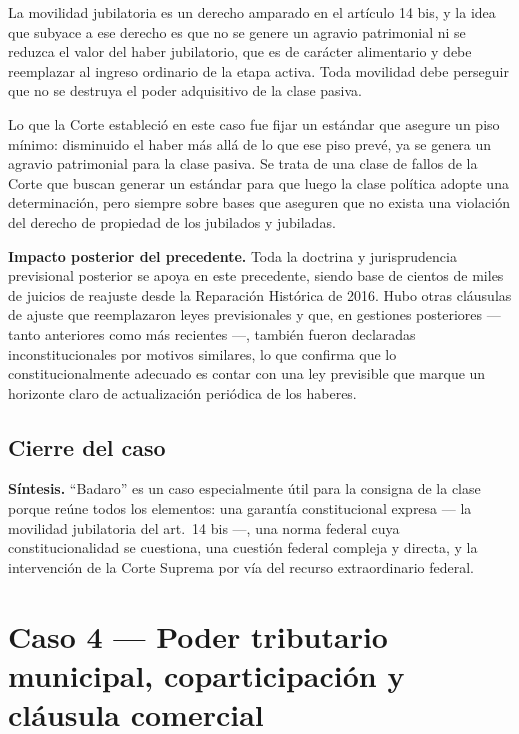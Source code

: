 \documentclass[12pt,oneside]{book}
\begin{document}
La movilidad jubilatoria es un derecho amparado en el artículo 14 bis, y la idea que subyace a ese derecho es que no se genere un agravio patrimonial ni se reduzca el valor del haber jubilatorio, que es de carácter alimentario y debe reemplazar al ingreso ordinario de la etapa activa. Toda movilidad debe perseguir que no se destruya el poder adquisitivo de la clase pasiva.

Lo que la Corte estableció en este caso fue fijar un estándar que asegure un piso mínimo: disminuido el haber más allá de lo que ese piso prevé, ya se genera un agravio patrimonial para la clase pasiva. Se trata de una clase de fallos de la Corte que buscan generar un estándar para que luego la clase política adopte una determinación, pero siempre sobre bases que aseguren que no exista una violación del derecho de propiedad de los jubilados y jubiladas.

\begin{note}
\textbf{Impacto posterior del precedente.} Toda la doctrina y jurisprudencia previsional posterior se apoya en este precedente, siendo base de cientos de miles de juicios de reajuste desde la Reparación Histórica de 2016. Hubo otras cláusulas de ajuste que reemplazaron leyes previsionales y que, en gestiones posteriores --- tanto anteriores como más recientes ---, también fueron declaradas inconstitucionales por motivos similares, lo que confirma que lo constitucionalmente adecuado es contar con una ley previsible que marque un horizonte claro de actualización periódica de los haberes.
\end{note}

\section{Cierre del caso}

\begin{important}
\textbf{Síntesis.} ``Badaro'' es un caso especialmente útil para la consigna de la clase porque reúne todos los elementos: una garantía constitucional expresa --- la movilidad jubilatoria del art.\ 14 bis ---, una norma federal cuya constitucionalidad se cuestiona, una cuestión federal compleja y directa, y la intervención de la Corte Suprema por vía del recurso extraordinario federal.
\end{important}

\chapter[Caso 4 --- Poder tributario municipal]{Caso 4 --- Poder tributario municipal, coparticipación y cláusula comercial}
\end{document}
